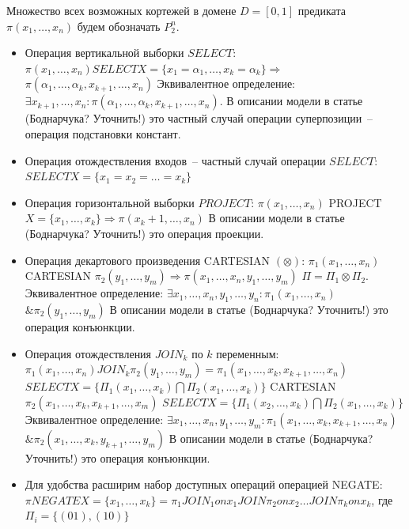 \documentclass[12pt]{article}
\begin{document}
Множество всех возможных кортежей в домене $D=[0,1]$ предиката $\pi(x_1, \dots, x_n)$ будем обозначать $P_2^n$. 
\begin{itemize}
\item Операция вертикальной выборки $SELECT$:
$\pi(x_1, \dots, x_n) SELECT X=\{x_1=\alpha_1, \ldots, x_k=\alpha_k\} \Longrightarrow$
$\pi(\alpha_1, \dots, \alpha_k, x_{k+1}, \dots, x_n)$
Эквивалентное определение: $\exists x_{k+1}, \dots, x_n: \pi(\alpha_1, \dots, \alpha_k, x_{k+1}, \dots, x_n)$. 
В описании модели в статье (Боднарчука? Уточнить!) это частный случай операции суперпозиции~-- операция подстановки констант.
\item Операция отождествления входов~-- частный случай операции $SELECT$: $SELECT X=\{x_1=x_2=\dots=x_k\}$
\item Операция горизонтальной выборки $PROJECT$:
$\pi(x_1, \dots, x_n)$ PROJECT $X=\{x_1, \dots, x_k\} \Longrightarrow \pi(x_k+1, \dots, x_n)$
В описании модели в статье (Боднарчука? Уточнить!) это операция проекции.
\item Операция декартового произведения CARTESIAN $(\otimes)$:
$\pi_1(x_1, \dots, x_n)$ CARTESIAN $\pi_2(y_1, \dots, y_m) \Longrightarrow \pi(x_1, \dots, x_n, y_1, \dots, y_m)$
$\Pi = \Pi_1 \otimes\Pi_2$.
Эквивалентное определение: $\exists x_1, \dots, x_n, y_1, \dots, y_n: \pi_1(x_{1}, \dots, x_n)$
$\& \pi_2(y_1, \dots, y_m)$
В описании модели в статье (Боднарчука? Уточнить!) это операция конъюнкции.
\item Операция отождествления $JOIN_k$ по $k$ переменным:
$\pi_1(x_1, \dots, x_n) JOIN_k \pi_2(y_1, \dots, y_m) = \pi_1(x_1, \dots, x_k, x_{k+1}, \dots, x_n)$
$SELECT X=\{\Pi_1(x_1, \dots, x_k) \bigcap \Pi_2(x_1, \dots, x_k)\}$ CARTESIAN $\pi_2(x_1, \dots, x_k, x_{k+1}, \dots, x_m)$
$SELECT X=\{\Pi_1(x_2, \dots, x_k) \bigcap  \Pi_2(x_1, \dots, x_k)\}$ 
Эквивалентное определение: $\exists x_1, \dots, x_n, y_1, \dots, y_m: \pi_1(x_{1}, \dots, x_k, x_{k+1}, \dots, x_n)$
$\& \pi_2(x_1, \dots, x_k, y_{k+1}, \dots, y_m)$
В описании модели в статье (Боднарчука? Уточнить!) это операция конъюнкции.
\item Для удобства расширим набор доступных операций операцией NEGATE: 
$\pi NEGATE X=\{x_1, \dots, x_k\} = \pi_1 JOIN_1 on x_1 JOIN \pi_2 on x_2 \dots JOIN \pi_k on x_k$, где 
$\Pi_i = \{ (01), (10) \}$
\end{itemize}
\end{document}
